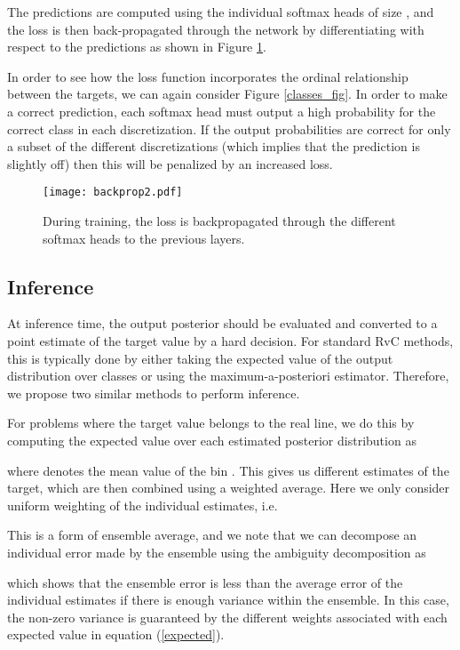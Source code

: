 \documentclass[10pt, conference, a4paper]{IEEEtran}
\begin{document}
The predictions  are computed using the  individual softmax heads of size , and the loss is then back-propagated through the network by differentiating with respect to the predictions as shown in Figure \ref{backprop}.

In order to see how the loss function incorporates the ordinal relationship between the targets, we can again consider Figure \ref{classes_fig}. In order to make a correct prediction, each softmax head must output a high probability for the correct class in each discretization. If the output probabilities are correct for only a subset of the  different discretizations (which implies that the prediction is slightly off) then this will be penalized by an increased loss.

\begin{figure}[t]
  \centering
  \texttt{[image: backprop2.pdf]}
  \caption{During training, the loss is backpropagated through the different softmax heads to the previous layers.}
\label{backprop}
\end{figure}

\subsection{Inference}
At inference time, the output posterior should be evaluated and converted to a point estimate of the target value by a hard decision. For standard RvC methods, this is typically done by either taking the expected value of the output distribution over classes or using the maximum-a-posteriori estimator. Therefore, we propose two similar methods to perform inference.

For problems where the target value  belongs to the real line, we do this by computing the expected value over each estimated posterior distribution as

where  denotes the mean value of the bin . This gives us  different estimates of the target, which are then combined using a weighted average. Here we only consider uniform weighting of the individual estimates, i.e.

This is a form of ensemble average, and we note that we can decompose an individual error made by the ensemble using the ambiguity decomposition \cite{brown2003use} as

which shows that the ensemble error is less than the average error of the individual estimates if there is enough variance within the ensemble. In this case, the non-zero variance is guaranteed by the different weights associated with each expected value in equation (\ref{expected}).
\end{document}
